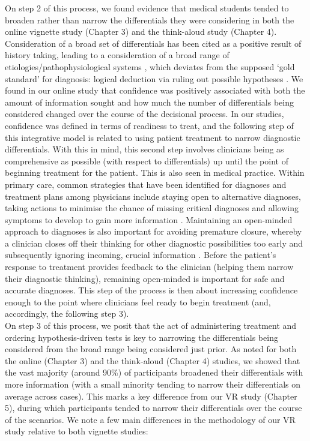 \documentclass[a4paper, nobind]{templates/ociamthesis}
\begin{document}
On step 2 of this process, we found evidence that medical students tended to broaden rather than narrow the differentials they were considering in both the online vignette study (Chapter 3) and the think-aloud study (Chapter 4). Consideration of a broad set of differentials has been cited as a positive result of history taking, leading to a consideration of a broad range of etiologies/pathophysiological systems \autocite{devries_improving_nodate}, which deviates from the supposed `gold standard' for diagnosis: logical deduction via ruling out possible hypotheses \autocite{kassirer_teaching_1983}. We found in our online study that confidence was positively associated with both the amount of information sought and how much the number of differentials being considered changed over the course of the decisional process. In our studies, confidence was defined in terms of readiness to treat, and the following step of this integrative model is related to using patient treatment to narrow diagnostic differentials. With this in mind, this second step involves clinicians being as comprehensive as possible (with respect to differentials) up until the point of beginning treatment for the patient. This is also seen in medical practice. Within primary care, common strategies that have been identified for diagnoses and treatment plans among physicians include staying open to alternative diagnoses, taking actions to minimise the chance of missing critical diagnoses and allowing symptoms to develop to gain more information \autocite{hewson_strategies_1996}. Maintaining an open-minded approach to diagnoses is also important for avoiding premature closure, whereby a clinician closes off their thinking for other diagnostic possibilities too early and subsequently ignoring incoming, crucial information \autocite{eva_difficulty_2006}. Before the patient's response to treatment provides feedback to the clinician (helping them narrow their diagnostic thinking), remaining open-minded is important for safe and accurate diagnoses. This step of the process is then about increasing confidence enough to the point where clinicians feel ready to begin treatment (and, accordingly, the following step 3).\\

On step 3 of this process, we posit that the act of administering treatment and ordering hypothesis-driven tests is key to narrowing the differentials being considered from the broad range being considered just prior. As noted for both the online (Chapter 3) and the think-aloud (Chapter 4) studies, we showed that the vast majority (around 90\%) of participants broadened their differentials with more information (with a small minority tending to narrow their differentials on average across cases). This marks a key difference from our VR study (Chapter 5), during which participants tended to narrow their differentials over the course of the scenarios. We note a few main differences in the methodology of our VR study relative to both vignette studies:
\end{document}
